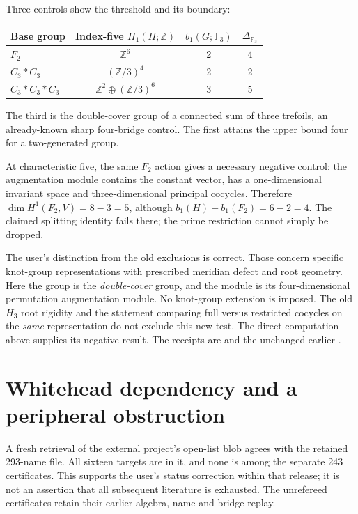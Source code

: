 \documentclass[11pt]{article}
\newcommand{\F}{\mathbb F}
\newcommand{\Z}{\mathbb Z}
\begin{document}
Three controls show the threshold and its boundary:
\begin{center}
\begin{tabular}{lccc}
\toprule
Base group & Index-five $H_1(H;\Z)$ & $b_1(G;\F_3)$ & $\Delta_{\F_3}$\\
\midrule
$F_2$ & $\Z^6$ &2&4\\
$C_3*C_3$ & $(\Z/3)^4$ &2&2\\
$C_3*C_3*C_3$ & $\Z^2\oplus(\Z/3)^6$ &3&5\\
\bottomrule
\end{tabular}
\end{center}
The third is the double-cover group of a connected sum of three
trefoils, an already-known sharp four-bridge control. The first
attains the upper bound four for a two-generated group.

At characteristic five, the same $F_2$ action gives a necessary
negative control: the augmentation module contains the constant
vector, has a one-dimensional invariant space and three-dimensional
principal cocycles. Therefore $\dim H^1(F_2,V)=8-3=5$, although
$b_1(H)-b_1(F_2)=6-2=4$. The claimed splitting identity fails there;
the prime restriction cannot simply be dropped.

The user's distinction from the old exclusions is correct. Those
concern specific knot-group representations with prescribed meridian
defect and root geometry. Here the group is the \emph{double-cover}
group, and the module is its four-dimensional permutation
augmentation module. No knot-group extension is imposed. The old
$H_3$ root rigidity and the statement comparing full versus
restricted cocycles on the \emph{same} representation do not exclude
this new test. The direct computation above supplies its negative
result. The receipts are 
and the unchanged earlier .

\section{Whitehead dependency and a peripheral obstruction}

A fresh retrieval of the external project's open-list blob agrees
with the retained 293-name file. All sixteen targets are in it,
and none is among the separate 243 certificates. This supports the
user's status correction within that release; it is not an assertion
that all subsequent literature is exhausted. The unrefereed
certificates retain their earlier algebra, name and bridge replay.
\end{document}

